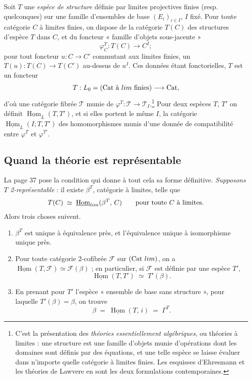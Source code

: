 \documentclass[11pt,a4paper]{article}
\begin{document}
Soit $T$ une \emph{espèce de structure} définie par limites projectives finies
(resp. quelconques) sur une famille d'ensembles de base $(E_{i})_{i \in I}$,
$I$ fixé. Pour toute catégorie $C$ à limites finies, on dispose de la catégorie
$T(C)$ des structures d'espèce $T$ dans $C$, et du foncteur « famille d'objets
sous-jacente »
\[
\varphi^{T}_{C} : T(C) \longrightarrow C^{I} ;
\]
pour tout foncteur $u : C \to C'$ commutant aux limites finies, un
$T(u) : T(C) \to T(C')$ au-dessus de $u^{I}$. Ces données étant fonctorielles,
$T$ est un foncteur
\[
T : L_{0} = (\mathrm{Cat} \text{ à } \varprojlim \text{ finies})
\longrightarrow \mathrm{Cat},
\]
d'où une catégorie fibrée $\mathcal{T}$ munie de $\varphi^{T} : \mathcal{T} \to
\mathcal{T}_{I}$.\footnote{C'est la présentation des \emph{théories
essentiellement algébriques}, ou théories à limites : une structure est une
famille d'objets munie d'opérations dont les domaines sont définis par des
équations, et une telle espèce se laisse évaluer dans n'importe quelle
catégorie à limites finies. Les esquisses d'Ehresmann et les théories de
Lawvere en sont les deux formulations contemporaines.} Pour deux espèces $T$,
$T'$ on définit $\underline{\operatorname{Hom}}_{L}(T,T')$, et si elles portent
le même $I$, la catégorie $\underline{\operatorname{Hom}}_{L}(I;T,T')$ des
homomorphismes munis d'une donnée de compatibilité entre $\varphi^{T}$ et
$\varphi^{T'}$.

\subsection*{Quand la théorie est représentable}

La page 37 pose la condition qui donne à tout cela sa forme définitive.
\emph{Supposons $T$ 2-représentable} : il existe $\beta^{T}$, catégorie à
limites, telle que
\[
T(C) \;\simeq\; \underline{\operatorname{Hom}}_{\varprojlim}(\beta^{T},\, C)
\qquad \text{pour toute } C \text{ à limites.}
\]
Alors trois choses suivent.

\begin{enumerate}
\item[a)] $\beta^{T}$ est unique à équivalence près, et l'équivalence unique à
isomorphisme unique près.
\item[b)] Pour toute catégorie 2-cofibrée $\mathcal{F}$ sur
$(\mathrm{Cat}\ \varprojlim)$, on a
$\underline{\operatorname{Hom}}(T, \mathcal{F}) \simeq \mathcal{F}(\beta)$ ; en
particulier, si $\mathcal{F}$ est définie par une espèce $T'$,
\[
\underline{\operatorname{Hom}}(T, T') \;\simeq\; T'(\beta).
\]
\item[c)] En prenant pour $T'$ l'espèce « ensemble de base sans structure »,
pour laquelle $T'(\beta) = \beta$, on trouve
\[
\beta \;=\; \underline{\operatorname{Hom}}(T,\, i) \;=\; \Gamma^{T}.
\]
\end{enumerate}
\end{document}
